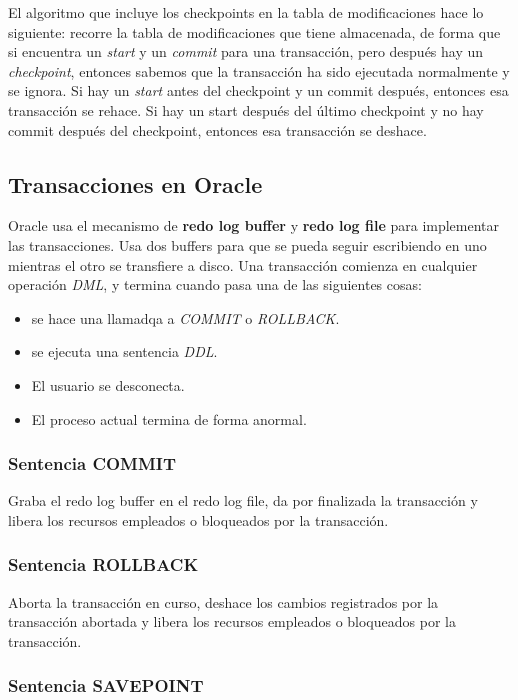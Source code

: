 El algoritmo que incluye los checkpoints en la tabla de modificaciones hace lo siguiente: recorre la tabla de modificaciones que tiene almacenada, de forma que si encuentra un \textit{start} y un \textit{commit} para una transacción, pero después hay un \textit{checkpoint}, entonces sabemos que la transacción ha sido ejecutada normalmente y se ignora. Si hay un \textit{start} antes del checkpoint y un commit después, entonces esa transacción se rehace. Si hay un start después del último checkpoint y no hay commit después del checkpoint, entonces esa transacción se deshace.

\subsection{Transacciones en Oracle}

Oracle usa el mecanismo de \textbf{redo log buffer} y \textbf{redo log file} para implementar las transacciones. Usa dos buffers para que se pueda seguir escribiendo en uno mientras el otro se transfiere a disco. Una transacción comienza en cualquier operación \textit{DML}, y termina cuando pasa una de las siguientes cosas:
\begin{itemize}
\item se hace una llamadqa a \textit{COMMIT} o \textit{ROLLBACK}.
\item se ejecuta una sentencia \textit{DDL}.
\item El usuario se desconecta.
\item El proceso actual termina de forma anormal.
\end{itemize}

\subsubsection{Sentencia COMMIT}

Graba el redo log buffer en el redo log file, da por finalizada la transacción y libera los recursos empleados o bloqueados por la transacción.

\subsubsection{Sentencia ROLLBACK}

Aborta la transacción en curso, deshace los cambios registrados por la transacción abortada y libera los recursos empleados o bloqueados por la transacción.

\subsubsection{Sentencia SAVEPOINT}

